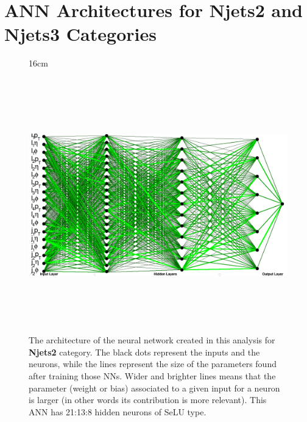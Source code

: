 \chapter{ANN Architectures for Njets2 and Njets3 Categories}
\label{app:nns_architecture}

\begin{figure}[H!]{16cm}
	\vspace{-20cm}
	\caption{The architecture of the neural network created in this analysis for \textbf{Njets2} category. The black dots represent the inputs and the neurons, while the lines represent the size of the parameters found after training those NNs. Wider and brighter lines means that the parameter (weight or bias) associated to a given input for a neuron is larger (in other words its contribution is more relevant). This ANN has 21:13:8 hidden neurons of SeLU type.}
	\includegraphics[width=18cm,height=11cm,angle=90]{ChapterAnalysis/figs/k57nj2_architecture_horizontal}
\end{figure}
	
